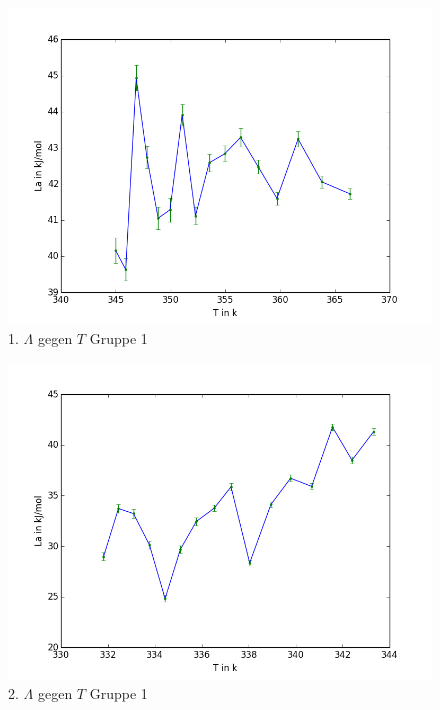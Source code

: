 \documentclass[12pt,a4paper]{article}
\begin{document}
\begin{figure}[H]
\centering
\includegraphics[scale=0.7]{Bilder/lamda_JM_1.png}
\caption{1. $\Lambda$ gegen $T$ Gruppe 1}
\end{figure}
\begin{figure}[H]
\centering
\includegraphics[scale=0.7]{Bilder/lamda_JM_2.png}
\caption{2. $\Lambda$ gegen $T$ Gruppe 1}
\end{figure}
\end{document}
